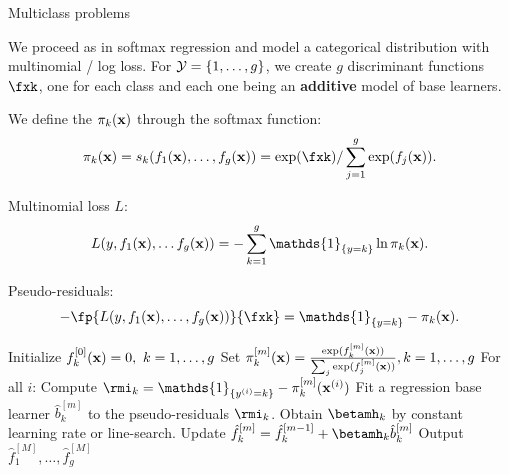 \begin{vbframe}{Multiclass problems}

We proceed as in softmax regression and model a categorical distribution with multinomial / log loss.
For $\mathcal{Y} = \{1, \ldots, g\}$, we create $g$ discriminant functions $\fxk$, one for each class and each one being an \textbf{additive} model of base learners.

We define the $\pi_k(\mathbf{x})$ through the softmax function:
$$ \pikx = s_k(f_1(\xv), \ldots, f_g(\xv)) = \exp(\fxk) / \sum_{j=1}^g \exp(f_j(\xv)). $$

Multinomial loss $L$:
$$ L(y, f_1(\xv), \ldots f_g(\xv)) = - \sumkg \mathds{1}_{\{y = k\}} \ln \pikx. $$

Pseudo-residuals:
$$-\fp{L(y, f_1(\xv), \ldots, f_g(\xv))}{\fxk} =  \mathds{1}_{\{y = k\}} - \pikx. $$


\framebreak

\begin{algorithm}[H]
  \begin{footnotesize}
  \begin{center}
  \caption{GB for Multiclass}
    \begin{algorithmic}[1]
      \State Initialize $f_{k}^{[0]}(\mathbf{x}) = 0,\ k = 1,\ldots,g$
      \State Set $\pi_{k}^{[m]}(\mathbf{x}) = \frac{\exp(f_k^{[m]}(\mathbf{x}))}{\sum_j \exp(f_j^{[m]}(\mathbf{x}))}, k = 1,\ldots,g$
            \State For all $i$: Compute $\rmi_k = \mathds{1}_{\{\yi = k\}} - \pik^{[m]}(\xi)$
              \State Fit a regression base learner $\hat{b}^{[m]}_k$ to the pseudo-residuals $\rmi_k$.
              \State Obtain $\betamh_k$ by constant learning rate or line-search.
              \State Update $\hat{f}_k^{[m]} = \hat{f}_k^{[m-1]} + \betamh_k \hat{b}^{[m]}_k$
            \EndFor
      \EndFor
    \State Output $\hat{f}_1^{[M]}, \ldots, \hat{f}_g^{[M]}$
    \end{algorithmic}
    \end{center}
    \end{footnotesize}
\end{algorithm}

\end{vbframe}



\endlecture

